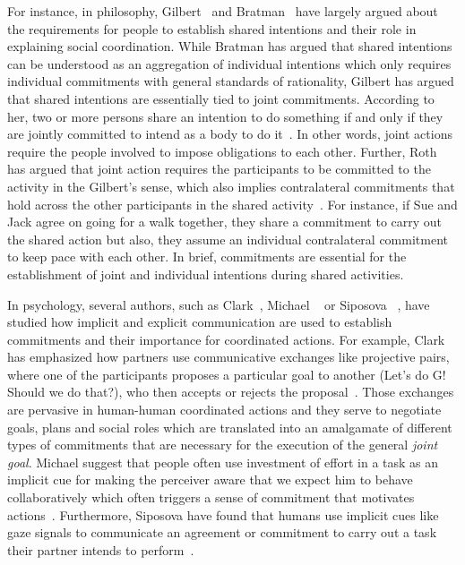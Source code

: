 \documentclass[a4paper,11pt,twoside]{StyleThese}
\begin{document}
For instance, in philosophy, Gilbert~\cite{gilbert_2009_shared} and Bratman~\cite{bratman_2014_shared} have largely argued about the requirements for people to establish shared intentions and their role in explaining social coordination. While Bratman has argued that shared intentions can be understood as an aggregation of individual intentions which only requires individual commitments with general standards of rationality, Gilbert has argued that shared intentions are essentially tied to joint commitments. According to her, two or more persons share an intention to do something if and only if they are jointly committed to intend as a body to do it~\cite{gilbert_2009_shared}. In other words, joint actions require the people involved to impose obligations to each other. Further, Roth has argued that joint action requires the participants to be committed to the activity in the Gilbert’s sense, which also implies contralateral commitments that hold across the other participants in the shared activity~\cite{roth_2014_shared}. For instance, if Sue and Jack agree on going for a walk together, they share a commitment to carry out the shared action but also, they assume an individual contralateral commitment to keep pace with each other. In brief, commitments are essential for the establishment of joint and individual intentions during shared activities. 

In psychology, several authors, such as Clark~\cite{clark_2006_social}, Michael \etal~\cite{michael2016} or Siposova \etal~\cite{siposova_2018_communicative}, have studied how implicit and explicit communication are used to establish commitments and their importance for coordinated actions. For example, Clark has emphasized how partners use communicative exchanges like projective pairs, where one of the participants proposes a particular goal to another (Let’s do G! Should we do that?), who then accepts or rejects the proposal~\cite{clark_2006_social}. Those exchanges are pervasive in human-human coordinated actions and they serve to negotiate goals, plans and social roles which are translated into an amalgamate of different types of commitments that are necessary for the execution of the general \textit{joint goal}. Michael \etal{} suggest that people often use investment of effort in a task as an implicit cue for making the perceiver aware that we expect him to behave collaboratively which often triggers a sense of commitment that motivates actions~\cite{michael2016}. Furthermore, Siposova \etal{} have found that humans use implicit cues like gaze signals to communicate an agreement or commitment to carry out a task their partner intends to perform~\cite{siposova_2018_communicative}.
\end{document}

